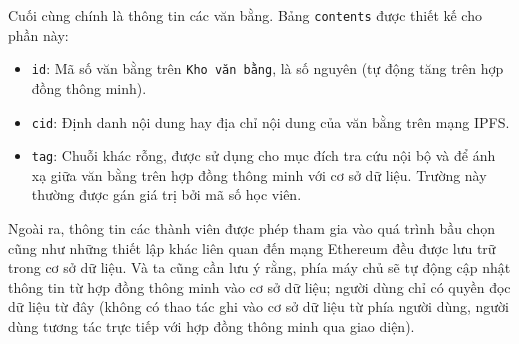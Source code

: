 Cuối cùng chính là thông tin các văn bằng. Bảng \texttt{contents} được thiết kế cho phần này:
\begin{itemize}
    \item \texttt{id}: Mã số văn bằng trên \texttt{Kho văn bằng}, là số nguyên (tự động tăng trên hợp đồng thông minh).
    \item \texttt{cid}: Định danh nội dung hay địa chỉ nội dung của văn bằng trên mạng IPFS.
    \item \texttt{tag}: Chuỗi khác rỗng, được sử dụng cho mục đích tra cứu nội bộ và để ánh xạ giữa văn bằng trên hợp đồng thông minh với cơ sở dữ liệu. Trường này thường được gán giá trị bởi mã số học viên.
\end{itemize}

Ngoài ra, thông tin các thành viên được phép tham gia vào quá trình bầu chọn cũng như những thiết lập khác liên quan đến mạng Ethereum đều được lưu trữ trong cơ sở dữ liệu. Và ta cũng cần lưu ý rằng, phía máy chủ sẽ tự động cập nhật thông tin từ hợp đồng thông minh vào cơ sở dữ liệu; người dùng chỉ có quyền đọc dữ liệu từ đây (không có thao tác ghi vào cơ sở dữ liệu từ phía người dùng, người dùng tương tác trực tiếp với hợp đồng thông minh qua giao diện).

